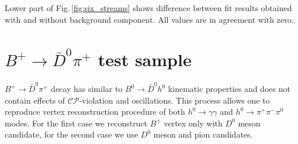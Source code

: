 \documentclass[preprint,aps,showpacs]{revtex4}
\newcommand{\cpconj}{\ensuremath{\mathcal{CP}}\xspace}
\newcommand{\bdh}{\ensuremath{B^0\to \bar D^0h^0}\xspace}
\newcommand{\bptodpi}{\ensuremath{B^{+}\to \bar D^0\pi^+}\xspace}
\begin{document}
Lower part of Fig.\,\ref{fig:six_streams} shows difference between fit results obtained with and without background component. All values are in agreement with zero.






\clearpage
\section{\bptodpi test sample}
 \bptodpi decay has similar to \bdh kinematic properties and does not contain effects of \cpconj-violation and oscillations. This process allows one to reproduce vertex reconstruction procedure of both $h^0\to \gamma\gamma$ and $h^0\to \pi^+\pi^-\pi^0$ modes. For the first case we reconstruct $B^+$ vertex only with $D^0$ meson candidate, for the second case we use $D^0$ meson and pion candidates.
\end{document}
